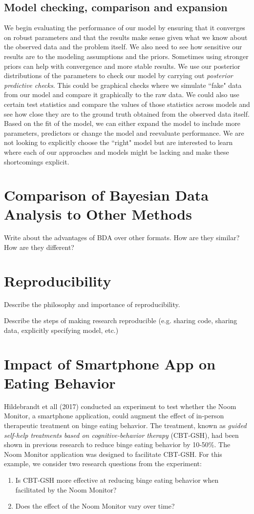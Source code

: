 \documentclass[12pt, oneside]{article}
\begin{document}
\subsection{Model checking, comparison and expansion}
We begin evaluating the performance of our model by ensuring that it converges on robust parameters and that the results make sense given what we know about the observed data and the problem itself. We also need to see how sensitive our results are to the modeling assumptions and the priors. Sometimes using stronger priors can help with convergence and more stable results. We use our posterior distributions of the parameters to check our model by carrying out \textit{posterior predictive checks}. This could be graphical checks where we simulate ``fake" data from our model and compare it graphically to the raw data. We could also use certain test statistics and compare the values of those statistics across models and see how close they are to the ground truth obtained from the observed data itself. Based on the fit of the model, we can either expand the model to include more parameters, predictors or change the model and reevaluate performance. We are not looking to explicitly choose the ``right" model but are interested to learn where each of our approaches and models might be lacking and make these shortcomings explicit.


\section{Comparison of Bayesian Data Analysis to Other Methods}
Write about the advantages of BDA over other formats.  How are they similar?  How are they different?

\section{Reproducibility}
Describe the philosophy and importance of reproducibility.  

Describe the steps of making research reproducible (e.g. sharing code, sharing data, explicitly specifying model, etc.)

\section{Impact of Smartphone App on Eating Behavior}

Hildebrandt et all (2017) conducted an experiment to test whether the Noom Monitor, a smartphone application, could augment the effect of in-person therapeutic treatment on binge eating behavior.  The treatment, known as \emph{guided self-help treatments based on cognitive-behavior therapy} (CBT-GSH), had been shown in previous research to reduce binge eating behavior by 10-50\%.  The Noom Monitor application was designed to facilitate CBT-GSH.  For this example, we consider two research questions from the experiment:
\begin{enumerate}
\item{Is CBT-GSH more effective at reducing binge eating behavior when facilitated by the Noom Monitor?}
\item{Does the effect of the Noom Monitor vary over time?}
\end{enumerate}
\end{document}
